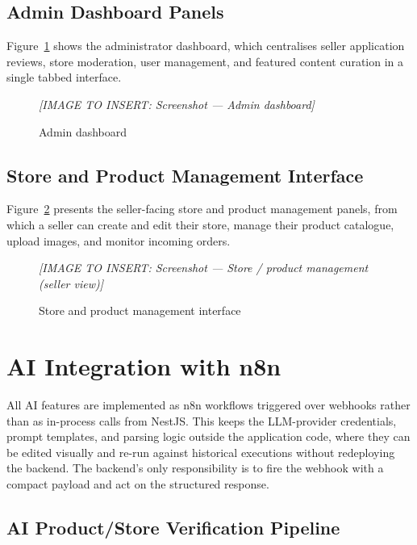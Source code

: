 \documentclass[12pt, a4paper, oneside]{report}
\newcommand{\imagePlaceholder}[2][8cm]{%
  \begin{mdframed}[backgroundcolor=cheebolightgray,linecolor=gray!40]
    \centering
    \vspace{#1}
    \textit{\color{gray}[IMAGE TO INSERT: #2]}
    \vspace{8mm}
  \end{mdframed}
}
\begin{document}
\subsection{Admin Dashboard Panels}

Figure~\ref{fig:admin-dashboard} shows the administrator dashboard,
which centralises seller application reviews, store moderation, user
management, and featured content curation in a single tabbed
interface.

\begin{figure}[H]
  \centering
  \imagePlaceholder[8cm]{Screenshot — Admin dashboard}
  \caption{Admin dashboard}
  \label{fig:admin-dashboard}
\end{figure}

\subsection{Store and Product Management Interface}

Figure~\ref{fig:seller-dashboard} presents the seller-facing store
and product management panels, from which a seller can create and
edit their store, manage their product catalogue, upload images,
and monitor incoming orders.

\begin{figure}[H]
  \centering
  \imagePlaceholder[8cm]{Screenshot — Store / product management (seller view)}
  \caption{Store and product management interface}
  \label{fig:seller-dashboard}
\end{figure}

\section{AI Integration with n8n}

All AI features are implemented as n8n workflows triggered over
webhooks rather than as in-process calls from NestJS. This keeps the
LLM-provider credentials, prompt templates, and parsing logic outside
the application code, where they can be edited visually and re-run
against historical executions without redeploying the backend. The
backend's only responsibility is to fire the webhook with a compact
payload and act on the structured response.

\subsection{AI Product/Store Verification Pipeline}
\end{document}
